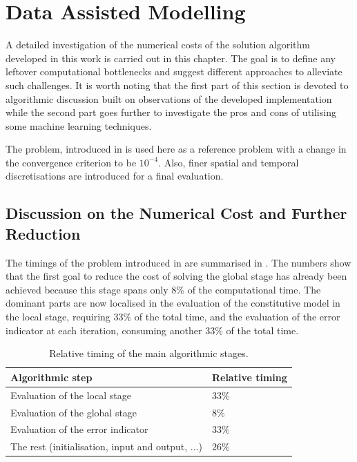 \chapter{Data Assisted Modelling}
\label{data_assisted}

A detailed investigation of the numerical costs of the solution algorithm developed in this work is carried out in this chapter. The goal is to define any leftover computational bottlenecks and suggest different approaches to alleviate such challenges. It is worth noting that the first part of this section is devoted to algorithmic discussion built on observations of the developed implementation while the second part goes further to investigate the pros and cons of utilising some machine learning techniques.

The problem, introduced in  is used here as a reference problem with a change in the convergence criterion to be $10^{-4}$. Also, finer spatial and temporal discretisations are introduced for a final evaluation.

\section{Discussion on the Numerical Cost and Further Reduction}
\label{sec7_further_reduction}

The timings of the problem introduced in  are summarised in . The numbers show that the first goal to reduce the cost of solving the global stage has already been achieved because this stage spans only $8 \percent$ of the computational time. The dominant parts are now localised in the evaluation of the constitutive model in the local stage, requiring $33 \percent$ of the total time, and the evaluation of the error indicator at each iteration, consuming another $33 \percent$ of the total time.

\begin{table}[hbt!]
	\caption{Relative timing of the main algorithmic stages.}
	\label{tab_timing}
	\centering
	\begin{tabular}{ll}
		\toprule
		\textbf{Algorithmic step}                        & \textbf{Relative timing} \\
		\midrule
		Evaluation of the local stage                    & $33 \percent$            \\
		Evaluation of the global stage                   & $8 \percent$             \\
		Evaluation of the error indicator                & $33 \percent$            \\
		The rest (initialisation, input and output, ...) & $26 \percent$            \\
		\bottomrule
	\end{tabular}
\end{table}

